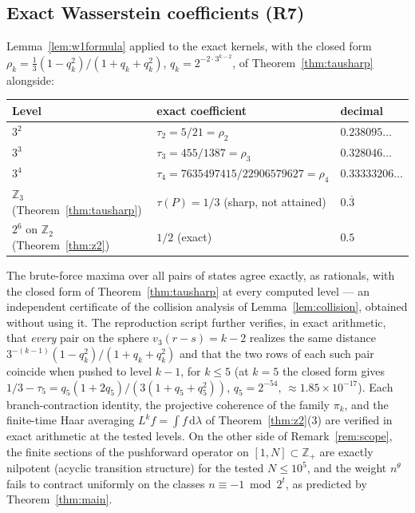 \documentclass[11pt]{amsart}
\theoremstyle{definition}
\theoremstyle{remark}
\newcommand{\Z}{\mathbb{Z}}
\newcommand{\Ztwo}{\Z_2}
\newcommand{\Zthree}{\Z_3}
\begin{document}
\subsection{Exact Wasserstein coefficients (R7)}\label{sec:results-wasserstein}
Lemma~\ref{lem:w1formula} applied to the exact kernels, with the closed form $\rho_k = \tfrac13(1-q_k^2)/(1+q_k+q_k^2)$, $q_k = 2^{-2\cdot 3^{k-2}}$, of Theorem~\ref{thm:tausharp} alongside:
\begin{center}
\small
\begin{tabular}{lll}
\toprule
Level & exact coefficient & decimal \\
\midrule
$3^2$ & $\tau_2 = 5/21 = \rho_2$ & $0.238095\ldots$ \\
$3^3$ & $\tau_3 = 455/1387 = \rho_3$ & $0.328046\ldots$ \\
$3^4$ & $\tau_4 = 7635497415/22906579627 = \rho_4$ & $0.33333206\ldots$ \\
$\Zthree$ (Theorem~\ref{thm:tausharp}) & $\tau(P) = 1/3$ (sharp, not attained) & $0.\overline{3}$ \\
$2^6$ on $\Ztwo$ (Theorem~\ref{thm:z2}) & $1/2$ (exact) & $0.5$ \\
\bottomrule
\end{tabular}
\end{center}
The brute-force maxima over all pairs of states agree exactly, as rationals, with the closed form of Theorem~\ref{thm:tausharp} at every computed level --- an independent certificate of the collision analysis of Lemma~\ref{lem:collision}, obtained without using it. The reproduction script further verifies, in exact arithmetic, that \emph{every} pair on the sphere $v_3(r-s) = k-2$ realizes the same distance $3^{-(k-1)}(1-q_k^2)/(1+q_k+q_k^2)$ and that the two rows of each such pair coincide when pushed to level $k-1$, for $k \le 5$ (at $k=5$ the closed form gives $1/3 - \tau_5 = q_5(1+2q_5)/(3(1+q_5+q_5^2))$, $q_5 = 2^{-54}$, $\approx 1.85 \times 10^{-17}$). Each branch-contraction identity, the projective coherence of the family $\pi_k$, and the finite-time Haar averaging $L^k f = \int f\,\mathrm{d}\lambda$ of Theorem~\ref{thm:z2}(3) are verified in exact arithmetic at the tested levels. On the other side of Remark~\ref{rem:scope}, the finite sections of the pushforward operator on $[1, N] \subset \Z_+$ are exactly nilpotent (acyclic transition structure) for the tested $N \le 10^5$, and the weight $n^\theta$ fails to contract uniformly on the classes $n \equiv -1 \bmod 2^t$, as predicted by Theorem~\ref{thm:main}.
\end{document}
